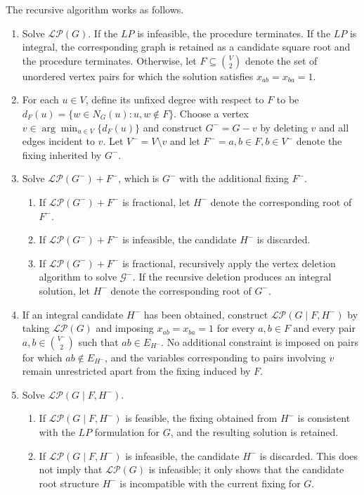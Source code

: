 \documentclass[11pt]{report}
\begin{document}
The recursive algorithm works as follows.
\begin{enumerate}[label=\roman*)]
  \item Solve $\mathcal{LP}(G)$. If the $LP$ is infeasible, the procedure terminates. If the $LP$ is integral, the corresponding graph is retained as a candidate square root and the procedure terminates. Otherwise, let $\displaystyle F\subseteq\binom{V}{2}$ denote the set of unordered vertex pairs for which the solution satisfies $x_{ab}=x_{ba}=1$.
  \item For each $u\in V$, define its unfixed degree with respect to $F$ to be $d_F(u)=\{w \in N_G(u):{u,w} \notin F\}$. Choose a vertex $\displaystyle v \in \arg\min_{u \in V} \{d_F(u)\}$ and construct $G^-=G-v$ by deleting $v$ and all edges incident to $v$. Let $V^-=V\setminus{v}$ and let
  $F^-={{a,b}\in F,b\in V^-}$ denote the fixing inherited by $G^-$.
  \item Solve $\mathcal{LP}(G^-) + F^-$, which is $G^-$ with the additional fixing $F^-$.
    \begin{enumerate}
      \item If $\mathcal{LP}(G^-) + F^-$ is fractional, let $H^-$ denote the corresponding root of $F^-$.
      \item If $\mathcal{LP}(G^-) + F^-$ is infeasible, the candidate $H^-$ is discarded. 
      \item If $\mathcal{LP}(G^-) + F^-$ is fractional, recursively apply the vertex deletion algorithm to solve $\mathcal{G^-}$. If the recursive deletion produces an integral solution, let $H^-$ denote the corresponding root of $G^-$.  
    \end{enumerate}
  \item If an integral candidate $H^-$ has been obtained, construct $\mathcal{LP}(G\mid F,H^-)$ by taking $\mathcal{LP}(G)$ and imposing $x_{ab}=x_{ba}=1$ for every ${a,b}\in F$ and every pair $ \displaystyle {a,b}\in\binom{V^-}{2}$ such that $ab\in E_{H^-}$. No additional constraint is imposed on pairs for which $ab\notin E_{H^-}$, and the variables corresponding to pairs involving $v$ remain unrestricted apart from the fixing induced by $F$.
  \item Solve $\mathcal{LP}(G\mid F,H^-)$.
    \begin{enumerate}
      \item If $\mathcal{LP}(G\mid F,H^-)$ is feasible, the fixing obtained from $H^-$ is consistent with the $LP$ formulation for $G$, and the resulting solution is retained.
      \item If $\mathcal{LP}(G\mid F,H^-)$ is infeasible, the candidate $H^-$ is discarded. This does not imply that $\mathcal{LP}(G)$ is infeasible; it only shows that the candidate root structure $H^-$ is incompatible with the current fixing for $G$.

\end{enumerate}
\end{enumerate}
\end{document}
